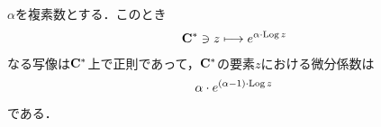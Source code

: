 	
	
	\begin{screen}
		\begin{thm}
			$\alpha$を複素数とする．このとき
			\begin{align}
				\mathbf{C}^* \ni z \longmapsto e^{\alpha \cdot \operatorname{Log}{z}}
			\end{align}
			なる写像は$\mathbf{C}^*$上で正則であって，$\mathbf{C}^*$の要素$z$における微分係数は
			\begin{align}
				\alpha \cdot e^{(\alpha-1) \cdot \operatorname{Log}{z}}
			\end{align}
			である．
		\end{thm}
	\end{screen}